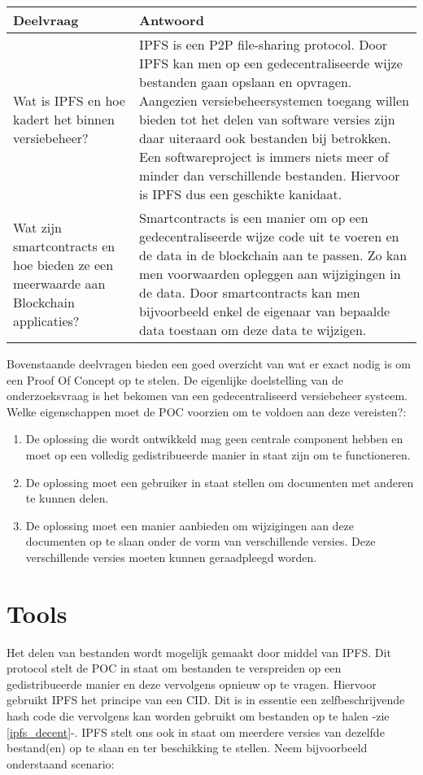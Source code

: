 \begin{table}[t!]
\begin{tabularx}{\linewidth}{ |X|X| }
\hline
Deelvraag & Antwoord \\ \hline
Wat is IPFS en hoe kadert het binnen versiebeheer? & IPFS is een P2P file-sharing protocol. Door IPFS kan men op een gedecentraliseerde wijze bestanden gaan opslaan en opvragen. Aangezien versiebeheersystemen toegang willen bieden tot het delen van software versies zijn daar uiteraard ook bestanden bij betrokken. Een softwareproject is immers niets meer of minder dan verschillende bestanden. Hiervoor is IPFS dus een geschikte kanidaat.\\ \hline
Wat zijn smartcontracts en hoe bieden ze een meerwaarde aan Blockchain applicaties? & Smartcontracts is een manier om op een gedecentraliseerde wijze code uit te voeren en de data in de blockchain aan te passen. Zo kan men voorwaarden opleggen aan wijzigingen in de data. Door smartcontracts kan men bijvoorbeeld enkel de eigenaar van bepaalde data toestaan om deze data te wijzigen.\\ \hline
\end{tabularx}
\end{table} 
\newpage
\newpage
Bovenstaande deelvragen bieden een goed overzicht van wat er exact nodig is om een Proof Of Concept op te stelen. De eigenlijke doelstelling van de onderzoeksvraag is het bekomen van een gedecentraliseerd versiebeheer systeem. Welke eigenschappen moet de POC voorzien om te voldoen aan deze vereisten?:

\begin{enumerate}
	\item De oplossing die wordt ontwikkeld mag geen centrale component hebben en moet op een volledig gedistribueerde manier in staat zijn om te functioneren.
	\item De oplossing moet een gebruiker in staat stellen om documenten met anderen te kunnen delen.
	\item De oplossing moet een manier aanbieden om wijzigingen aan deze documenten op te slaan onder de vorm van verschillende versies. Deze verschillende versies moeten kunnen geraadpleegd worden.
\end{enumerate}

\section{Tools}
\label{Tools}
Het delen van bestanden wordt mogelijk gemaakt door middel van IPFS. Dit protocol stelt de POC in staat om bestanden te verspreiden op een gedistribueerde manier en deze vervolgens opnieuw op te vragen. Hiervoor gebruikt IPFS het principe van een CID. Dit is in essentie een zelfbeschrijvende hash code die vervolgens kan worden gebruikt om bestanden op te halen -zie \ref{ipfs_decent}-. IPFS stelt ons ook in staat om meerdere versies van dezelfde bestand(en) op te slaan en ter beschikking te stellen. Neem bijvoorbeeld onderstaand scenario:\\

